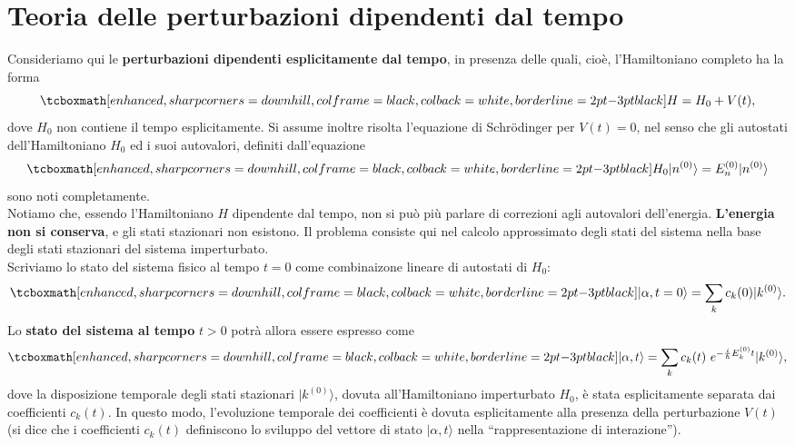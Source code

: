 \chapter[T.d.P. dipendenti dal tempo]{Teoria delle perturbazioni dipendenti dal tempo}
Consideriamo qui le \textbf{perturbazioni dipendenti esplicitamente dal tempo}, in presenza delle quali, cioè, l'Hamiltoniano completo ha la forma
	\begin{equation}
		\tcboxmath[enhanced, sharp corners=downhill, colframe=black, colback=white, borderline={2pt}{-3pt}{black}]{
			H=H_0+V(t),
		}
	\end{equation}
dove $H_0$ non contiene il tempo esplicitamente. Si assume inoltre risolta l'equazione di Schr\"{o}dinger per $V(t)=0$, nel senso che gli autostati dell'Hamiltoniano $H_0$ ed i suoi autovalori, definiti dall'equazione
	\begin{equation}
		\tcboxmath[enhanced, sharp corners=downhill, colframe=black, colback=white, borderline={2pt}{-3pt}{black}]{
			H_0 \vert n ^{(0)} \rangle = E_n ^{(0)} \vert n ^{(0)} \rangle 
			}
	\end{equation}
sono noti completamente.\\

Notiamo che, essendo l'Hamiltoniano $H$ dipendente dal tempo, non si può più parlare di correzioni agli autovalori dell'energia. \textbf{L'energia non si conserva}, e gli stati stazionari non esistono. Il problema consiste qui nel calcolo approssimato degli stati del sistema nella base degli stati stazionari del sistema imperturbato.\\

Scriviamo lo stato del sistema fisico al tempo $t=0$ come combinaizone lineare di autostati di $H_0$:
	\begin{equation}
		\tcboxmath[enhanced, sharp corners=downhill, colframe=black, colback=white, borderline={2pt}{-3pt}{black}]{
			\vert \alpha ,t=0  \rangle = \sum _k c_k (0) \vert k ^{(0)} \rangle .
			}
	\label{eq:cap15_1}
	\end{equation}
Lo \textbf{stato del sistema al tempo} $t>0$ potrà allora essere espresso come
	\begin{equation}
		\tcboxmath[enhanced, sharp corners=downhill, colframe=black, colback=white, borderline={2pt}{-3pt}{black}]{
			\vert \alpha ,t  \rangle = \sum _k c_k (t)\ e^{-\frac{i}{\hbar}E_k ^{(0)} t } \vert k ^{(0)} \rangle ,
			}
	\label{eq:cap15_2}
	\end{equation}
dove la disposizione temporale degli stati stazionari $\vert k ^{(0)} \rangle$, dovuta all'Hamiltoniano imperturbato $H_0$, è stata esplicitamente separata dai coefficienti $c_k {(t)}$. In questo modo, l'evoluzione temporale dei coefficienti è dovuta esplicitamente alla presenza della perturbazione $V(t)$  (si dice che i coefficienti $c_k (t)$ definiscono lo sviluppo del vettore di stato $\vert \alpha , t \rangle $ nella ``rappresentazione di interazione'').\\

